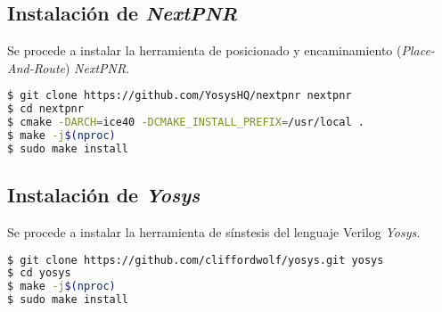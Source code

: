 \subsection{Instalación de \emph{NextPNR}}
Se procede a instalar la herramienta de posicionado y encaminamiento (\emph{Place-And-Route}) \emph{NextPNR}.

\begin{lstlisting}[language=bash]
$ git clone https://github.com/YosysHQ/nextpnr nextpnr
$ cd nextpnr
$ cmake -DARCH=ice40 -DCMAKE_INSTALL_PREFIX=/usr/local .
$ make -j$(nproc)
$ sudo make install
\end{lstlisting}


\subsection{Instalación de \emph{Yosys}}
Se procede a instalar la herramienta de sínstesis del lenguaje Verilog \emph{Yosys}.

\begin{lstlisting}[language=bash]
$ git clone https://github.com/cliffordwolf/yosys.git yosys
$ cd yosys
$ make -j$(nproc)
$ sudo make install
\end{lstlisting}